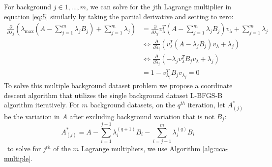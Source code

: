 \documentclass[12pt]{article}
\begin{document}
For background $j \in 1,...,m$, we can solve for the $j$th Lagrange multiplier in equation \ref{eq:5} similarly by taking the partial derivative and setting to zero:
\begin{align}
    \frac{\partial}{\partial \lambda_j}\left(\lambda_{\text{max}}\left(A - \sum^{m}_{j = 1}{\lambda_j B_j}\right) + \sum^{m}_{j=1}{\lambda_j}\right)&=\frac{\partial}{\partial \lambda_j}v_{\lambda}^T\left(A - \sum^{m}_{j = 1}{\lambda_j B_j}\right)v_{\lambda} + \sum^{m}_{j=1}{\lambda_j}\nonumber\\
                                                                                                                                                    &\Leftrightarrow \frac{\partial}{\partial \lambda_j}\left(v_{\lambda}^T\left(A - \lambda_j B_j \right)v_{\lambda}+\lambda_j\right)\nonumber \\ 
                                                                                                                        &\Leftrightarrow \frac{\partial}{\partial \lambda_j}\left(-\lambda_j v_{\lambda}^T  B_j v_{\lambda} +\lambda_j \right)\nonumber \\ 
                                                                                                                        &= 1-v_{\lambda_j}^{T}B_j v_{\lambda_j} = 0 \label{eq:6}
\end{align}
To solve this multiple background dataset problem we propose a coordinate descent algorithm that utilizes the single background dataset L-BFGS-B \cite{byrd1995limited} algorithm iteratively. 
For $m$ background datasets, on the $q^{th}$ iteration, let $A_{(j)}^*$ be the variation in $A$ after excluding background variation that is not $B_j$:
\[A_{(j)}^{*} = A - \sum_{ i = 1 }^{j-1}\lambda_{i}^{(q+1)}B_i - \sum_{i =j+1}^{m}\lambda_{i}^{(q)}B_i \] \
to solve for $j^{th}$ of the $m$ Lagrange multipliers, we use Algorithm \ref{alg:uca-multiple}.
\end{document}

